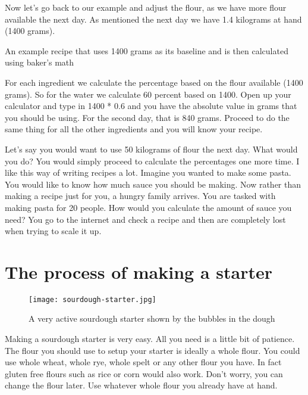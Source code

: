 Now let's go back to our example and adjust the flour, as we have
more flour available the next day. As mentioned the next day
we have 1.4 kilograms at hand (1400 grams).

\begin{table}[!htb]
    \begin{center}
        
        \caption{An example recipe that uses 1400 grams as its baseline and
        is then calculated using baker's math}
    \end{center}
\end{table}

For each ingredient we calculate the percentage
based on the flour available (1400 grams). So for the water
we calculate 60 percent based on 1400. Open up your
calculator and type in 1400 * 0.6 and you have
the absolute value in grams that you should be using.
For the second day, that is 840 grams. Proceed to do the same
thing for all the other ingredients and you will know
your recipe.


Let's say you would want to use 50 kilograms of flour
the next day. What would you do? You would simply proceed
to calculate the percentages one more time. I like this
way of writing recipes a lot. Imagine you wanted to make
some pasta. You would like to know how much sauce you should
be making. Now rather than making a recipe just for you, a
hungry family arrives. You are tasked with making pasta
for 20 people. How would you calculate the amount of sauce
you need? You go to the internet and check a recipe and then
are completely lost when trying to scale it up.

\section{The process of making a starter}

\begin{figure}[!htb]
  \texttt{[image: sourdough-starter.jpg]}
  \caption{A very active sourdough starter shown by the bubbles in the dough}
  \label{fig:sourdough-starter}
\end{figure}

Making a sourdough starter is very easy. All you need
is a little bit of patience. The flour you should
use to setup your starter is ideally a whole flour.
You could use whole wheat, whole rye, whole spelt or
any other flour you have. In fact gluten free flours such
as rice or corn would also work. Don't worry, you can
change the flour later. Use whatever whole flour you
already have at hand.

